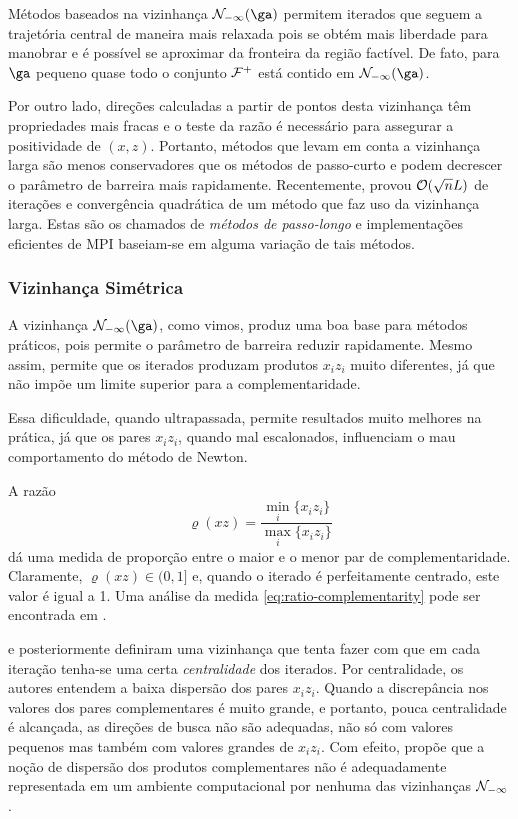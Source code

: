  
 Métodos baseados na vizinhança $\Nset_{-\infty}(\ga)$ permitem iterados que
 seguem a trajetória central de maneira mais relaxada  pois se obtém mais
 liberdade para manobrar e é possível se aproximar da fronteira da região
 factível. De fato, para $\ga$ pequeno quase todo o conjunto $\mathcal{F}^+$ está
 contido em $\Nset_{-\infty}(\ga)$. 

 Por outro lado, direções calculadas a partir
 de pontos desta vizinhança têm propriedades mais fracas e o teste da razão é
 necessário para assegurar a positividade de $(x,z)$. Portanto, métodos que
 levam em conta a vizinhança larga são menos conservadores que os métodos de
 passo-curto e podem decrescer o parâmetro de barreira mais rapidamente. Recentemente, \textcite{Potra:1994dy} provou $\mathcal{O}(\sqrt{n}L)$ de iterações e convergência quadrática de um método que faz uso da vizinhança larga. Estas são os
 chamados de \emph{métodos de passo-longo}  e implementações eficientes de
 \ac{MPI} baseiam-se em alguma variação de tais métodos.
 
 \subsubsection{Vizinhança Simétrica}
\label{sec:symmetric-neig}  
 A vizinhança $\Nset_{-\infty}(\ga)$, como vimos,  produz uma boa base para
 métodos práticos, pois permite o parâmetro de barreira reduzir rapidamente.
 Mesmo assim, permite que os iterados produzam produtos $x_iz_i$ muito
 diferentes, já que não impõe um limite superior para a complementaridade.
 
 Essa dificuldade, quando ultrapassada, permite resultados muito melhores na
 prática, já que os pares $x_iz_i$, quando mal escalonados, influenciam o mau
 comportamento do método de Newton.
 
 A razão 
\begin{equation}
\label{eq:ratio-complementarity}
\varrho(xz) = \frac{\min_i\{x_iz_i\}}{\max_i\{x_iz_i\}}
\end{equation}
dá uma medida de proporção entre o maior e o menor par de complementaridade.
 Claramente, $\varrho(xz)\in(0,1]$ e, quando o iterado é perfeitamente
centrado, este valor é igual a 1. Uma
análise da medida \eqref{eq:ratio-complementarity} pode ser encontrada em
\textcite{Jansen:1jv}.
 

\textcite{Gondzio:1996uw} e posteriormente \textcite{Colombo:2008wm,Colombo:2008ia}
definiram uma vizinhança que tenta fazer com que em cada iteração tenha-se uma
certa \emph{centralidade} dos iterados.  Por centralidade, os autores entendem a
baixa dispersão dos pares $x_iz_i$. Quando a discrepância nos
valores dos pares complementares é muito grande, e portanto,  pouca
centralidade é alcançada, as direções de busca não são adequadas, não só com valores
pequenos mas também com valores grandes de $x_iz_i$. Com efeito, \textcite[pp.
26]{Colombo:2008wm} propõe que a noção de dispersão dos produtos
complementares não é adequadamente  representada em um ambiente computacional
por nenhuma das  vizinhanças  $\mathcal{N}_{-\infty}$.



